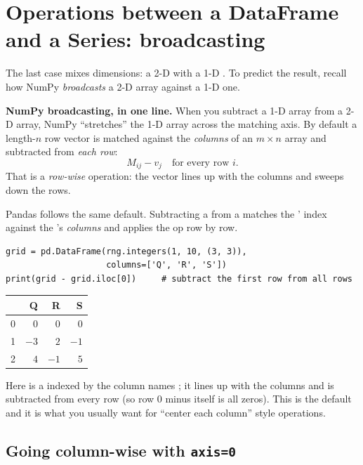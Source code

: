 \documentclass[11pt]{article}
\begin{document}
\section{Operations between a DataFrame and a Series: broadcasting}

The last case mixes dimensions: a 2-D  with a 1-D . To predict the result, recall how NumPy \emph{broadcasts} a 2-D array against a 1-D one.

\begin{pyrefresh}
\textbf{NumPy broadcasting, in one line.} When you subtract a 1-D array from a 2-D array, NumPy ``stretches'' the 1-D array across the matching axis. By default a length-$n$ row vector is matched against the \emph{columns} of an $m\times n$ array and subtracted from \emph{each row}:
\[
  M_{ij} - v_j \quad\text{for every row } i.
\]
That is a \emph{row-wise} operation: the vector lines up with the columns and sweeps down the rows.
\end{pyrefresh}

Pandas follows the same default. Subtracting a  from a  matches the ' index against the 's \emph{columns} and applies the op row by row.

\begin{lstlisting}
grid = pd.DataFrame(rng.integers(1, 10, (3, 3)),
                    columns=['Q', 'R', 'S'])
print(grid - grid.iloc[0])     # subtract the first row from all rows
\end{lstlisting}

\begin{outbox}
\begin{tabular}{l r r r}
\toprule
 & \textbf{Q} & \textbf{R} & \textbf{S} \\
\midrule
0 & $0$ & $0$ & $0$ \\
1 & $-3$ & $2$ & $-1$ \\
2 & $4$ & $-1$ & $5$ \\
\bottomrule
\end{tabular}
\end{outbox}

Here  is a  indexed by the column names \code{['Q','R','S']}; it lines up with the columns and is subtracted from every row (so row $0$ minus itself is all zeros). This is the default and it is what you usually want for ``center each column'' style operations.

\subsection{Going column-wise with \texttt{axis=0}}
\end{document}
